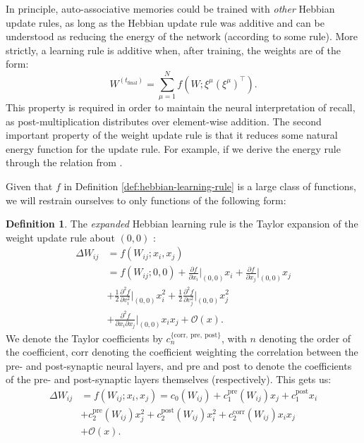 \documentclass{article}
\theoremstyle{definition}
\newtheorem{definition}{Definition}[subsection]
\begin{document}
In principle, auto-associative memories could be trained with
\textit{other} Hebbian update rules, as long as the Hebbian update
rule was additive and can be understood as reducing the energy of the network
(according to some rule). More strictly, a learning rule is additive when,
after training, the weights are of the form:
\begin{equation}
  W^{(t_\text{final})} = \sum^N_{\mu = 1} f(W; \xi^\mu (\xi^\mu)^\top).
\end{equation}
This property is required in order to maintain the neural interpretation
of recall, as post-multiplication distributes over element-wise addition.
The second important property of the weight update rule is that it reduces
some natural energy function for the update rule. For example, if we derive the
energy rule through the relation from \textcite{krotov_hierarchical_2021}.

Given that $f$ in
Definition \ref{def:hebbian-learning-rule} is a large class of functions,
we will restrain ourselves to only functions of the following form:
\begin{definition}\label{def:expanded-learning}
  The \textit{expanded} Hebbian learning rule is the Taylor expansion
  of the weight update rule about $(0, 0)$
  \parencite{gerstner_mathematical_2002}:
  \begin{align*}
    \Delta W_{ij} &= f(W_{ij}; x_i, x_j) \\
    &= f(W_{ij}; 0, 0) + \frac{\partial f}{\partial x_i} \big|_{(0,
    0)} x_i + \frac{\partial f}{\partial x_j}
    \big|_{(0, 0)} x_j \\
    &+ \frac{1}{2} \frac{\partial^2 f}{\partial v^2_i} \big|_{(0, 0)}
    x_i^2 + \frac{1}{2} \frac{\partial^2 f}{\partial v^2_j}\big|_{(0,
    0)} x_j^2 \\
    &+ \frac{\partial^2 f}{\partial x_i \partial x_j}\big|_{(0, 0)}
    x_i x_j + \mathcal{O}(x).
  \end{align*}
  We denote the Taylor coefficients by
  $c_n^{\{\text{corr},~\text{pre},~\text{post}\}}$, with
  $n$ denoting the order of the coefficient, $\text{corr}$ denoting
  the coefficient
  weighting the correlation between the pre- and post-synaptic neural
  layers, and
  $\text{pre}$ and $\text{post}$ to denote the coefficients of the
  pre- and post-synaptic
  layers themselves (respectively).
  This gets us:
  \begin{align*}
    \Delta W_{ij} &= f(W_{ij}; x_i, x_j) =
    c_0 (W_{ij}) + c_1^\text{pre} (W_{ij}) x_j + c_1^\text{post} x_i \\
    &+ c_2^\text{pre} (W_{ij}) x_j^2 + c_2^\text{post} (W_{ij}) x_i^2
    + c_2^\text{corr} (W_{ij}) x_i x_j \\
    &+ \mathcal{O} (x).
  \end{align*}
\end{definition}
\end{document}
